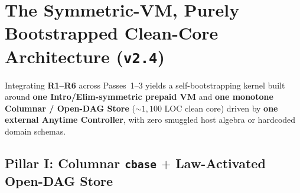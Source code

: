 \documentclass[12pt]{article}
\begin{document}
\section{The Symmetric-VM, Purely Bootstrapped Clean-Core Architecture (\texttt{v2.4})}
\label{sec:arch}

Integrating \textbf{R1--R6} across Passes~1--3 yields a self-bootstrapping kernel built around \textbf{one Intro/Elim-symmetric prepaid VM} and \textbf{one monotone Columnar / Open-DAG Store} ($\sim 1,100$ LOC clean core) driven by \textbf{one external Anytime Controller}, with zero smuggled host algebra or hardcoded domain schemas.

\subsection{Pillar I: Columnar \texttt{cbase} \texorpdfstring{$+$}{+} Law-Activated Open-DAG Store}
\label{sec:arch-store}
\end{document}

